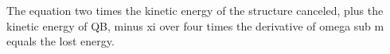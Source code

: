 The equation two times the kinetic energy of the structure canceled, plus the kinetic energy of QB, minus xi over four times the derivative of omega sub m equals the lost energy.